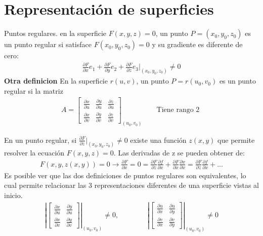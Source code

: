 \documentclass{article}
\newcommand{\caja}[3]{%
  \begin{tcolorbox}[colback=#1!5!white,colframe=#1!25!black,title=#2]
    #3
  \end{tcolorbox}%
}
\begin{document}
\section{Representación de superficies }
\caja{red}{Definición puntos regulares }{
  Puntos regulares. en la superficie $ F\left(x,y,z \right)=0  $, un punto $ P = (x_0,y_0,z_0) $ es un punto regular si satisface $ F\left(x_0,y_0,z_0 \right)=0  $ y su gradiente es diferente de cero: 
  \begin{gather}
    \frac{\partial F }{\partial x}e_1 + \frac{\partial F }{\partial y }e_2 + \frac{\partial F }{\partial z}e_3 |_{(x_0,y_0,z_0)} \neq 0 
    \label{eq:puntos_regulares}
  \end{gather}
  \tcblower 
  \textbf{Otra definicion } En la superficie $ r(u,v) $, un punto $ P = r(u_0,v_0 ) $ es un punto regular si la matriz 
  \begin{gather}
    A = \begin{bmatrix}
        \frac{\partial x}{\partial u} & \frac{\partial y}{\partial u} & \frac{\partial z}{\partial u} \\
        \frac{\partial x}{\partial v} & \frac{\partial y}{\partial v} & \frac{\partial z}{\partial v} 
    \end{bmatrix} _{(u_0,v_0 )} \qquad \text{Tiene rango 2 }
    \label{eq:def2_punto_regular}
  \end{gather}
  
}

\caja{green}{Teorema funcion implicita }{
  En un punto regular, si $ \frac{\partial F }{\partial z}|_{(x_0,y_0,z_0)} \neq 0$ existe una función $ z\left(x,y\right) $ que permite resolver la ecuación $ F\left(x,y,z \right)=0  $. Las derivadas de z se pueden obtener de: 
  \begin{gather}
    F\left(x,y,z\left(x,y\right)\right)=0 \rightarrow \frac{\partial F }{\partial x} = 0 = \frac{\partial F }{\partial z}\frac{\partial f }{\partial x}+\frac{\partial F }{\partial x}\frac{\partial x }{\partial x} = \frac{\partial F }{\partial z}\frac{\partial f }{\partial x} + ...
    \label{eq:func_implicita}
  \end{gather}
  Es posible ver que las dos definiciones de puntos regulares son equivalentes, lo cual permite relacionar las 3 representaciones diferentes de una superficie vistas al inicio. 
  \begin{gather}
     \left|\begin{bmatrix}
         \frac{\partial x}{\partial u} & \frac{\partial y}{\partial u} \\
         \frac{\partial x}{\partial v} & \frac{\partial y}{\partial v}
     \end{bmatrix} \right|_{(u_0, v_0 )} \neq 0 , \qquad \qquad \left|\begin{bmatrix}
         \frac{\partial u}{\partial x} & \frac{\partial u}{\partial y} \\
         \frac{\partial v}{\partial x} & \frac{\partial v}{\partial y}
     \end{bmatrix} \right|_{(u_0, v_0 )} \neq 0 
  \end{gather}
}
\end{document}
